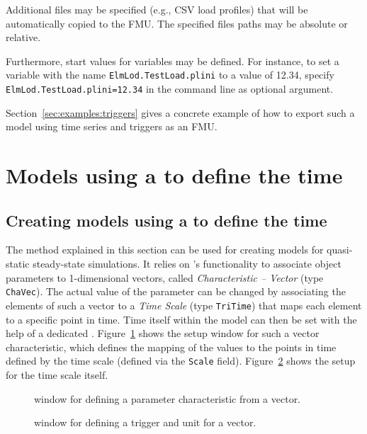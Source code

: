 Additional files may be specified (e.g., CSV load profiles) that will be automatically copied to the FMU. The specified files paths may be absolute or relative.

Furthermore, start values for variables may be defined. For instance, to set a variable with the name \texttt{ElmLod.TestLoad.plini} to a value of 12.34, specify \texttt{ElmLod.TestLoad.plini=12.34} in the command line as optional argument.

Section~\ref{sec:examples:triggers} gives a concrete example of how to export such a model using time series and triggers as an FMU.

\newpage

\section{Models using a \dplscript to define the time}

\subsection{Creating models using a \dplscript to define the time}
\label{sec:export:create_model_dplscript}

The method explained in this section can be used for creating models for quasi-static steady-state simulations.
It relies on \pf's functionality to associate object parameters to 1-dimensional vectors, called \emph{Characteristic -- Vector} (type \texttt{ChaVec}).
The actual value of the parameter can be changed by associating the elements of such a vector to a \emph{Time Scale} (type \texttt{TriTime}) that maps each element to a specific point in time.
Time itself within the model can then be set with the help of a dedicated \dplscript.
Figure~\ref{fig:characteristics_from_vector} shows the setup window for such a vector characteristic, which defines the mapping of the values to the points in time defined by the time scale (defined via the \texttt{Scale} field).
Figure~\ref{fig:trigger_for_vector} shows the setup for the time scale itself.


\begin{figure}[h!]
\vspace*{1ex}
\caption{\pf window for defining a parameter characteristic from a vector.}
\label{fig:characteristics_from_vector}
\end{figure}

\begin{figure}[h!]
\vspace*{1ex}
\caption{\pf window for defining a trigger and unit for a vector.}
\label{fig:trigger_for_vector}
\end{figure}

